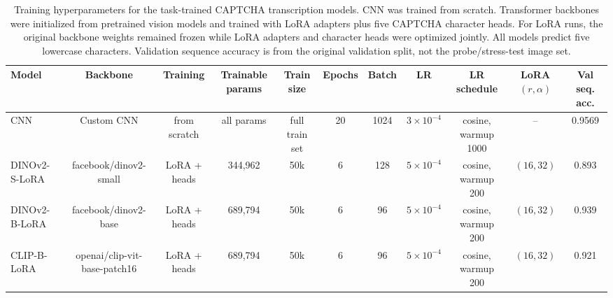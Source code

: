 \begin{table}[t]
\centering
\small
\setlength{\tabcolsep}{4pt}
\begin{tabular}{lcccccccccc}
\hline
Model & Backbone & Training & Trainable params & Train size & Epochs & Batch & LR & LR schedule & LoRA $(r,\alpha)$ & Val seq. acc. \\
\hline
CNN & Custom CNN & from scratch & all params & full train set & 20 & 1024 & $3{\times}10^{-4}$ & cosine, warmup 1000 & -- & 0.9569 \\
DINOv2-S-LoRA & facebook/dinov2-small & LoRA + heads & 344,962 & 50k & 6 & 128 & $5{\times}10^{-4}$ & cosine, warmup 200 & $(16,32)$ & 0.893 \\
DINOv2-B-LoRA & facebook/dinov2-base & LoRA + heads & 689,794 & 50k & 6 & 96 & $5{\times}10^{-4}$ & cosine, warmup 200 & $(16,32)$ & 0.939 \\
CLIP-B-LoRA & openai/clip-vit-base-patch16 & LoRA + heads & 689,794 & 50k & 6 & 96 & $5{\times}10^{-4}$ & cosine, warmup 200 & $(16,32)$ & 0.921 \\
\hline
\end{tabular}
\caption{
Training hyperparameters for the task-trained CAPTCHA transcription models.
CNN was trained from scratch. Transformer backbones were initialized from pretrained vision models and trained with LoRA adapters plus five CAPTCHA character heads.
For LoRA runs, the original backbone weights remained frozen while LoRA adapters and character heads were optimized jointly.
All models predict five lowercase characters. Validation sequence accuracy is from the original validation split, not the probe/stress-test image set.
}
\label{tab:training-hyperparams}
\end{table}
